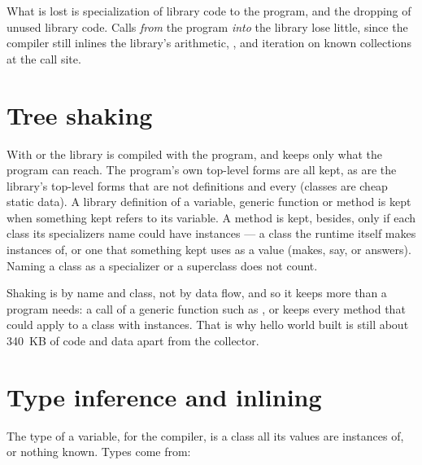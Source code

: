 What is lost is specialization of library code to the program, and the
dropping of unused library code. Calls \emph{from} the program
\emph{into} the library lose little, since the compiler still inlines
the library's arithmetic, ,  and iteration on
known collections at the call site.

\section{Tree shaking}\label{sec:internals-shaking}

With  or  the library is compiled with the
program, and  keeps only what the program can
reach. The program's own top-level forms are all kept, as are the
library's top-level forms that are not definitions and every
 (classes are cheap static data). A library
definition of a variable, generic function or method is kept when
something kept refers to its variable. A method is kept, besides, only
if each class its specializers name could have instances --- a class
the runtime itself makes instances of, or one that something kept uses
as a value (makes, say, or answers). Naming a class as a specializer or
a superclass does not count.

Shaking is by name and class, not by data flow, and so it keeps more
than a program needs: a call of a generic function such as
,  or  keeps every method that
could apply to a class with instances. That is why hello world built
 is still about 340~KB of code and data apart from the collector.

\section{Type inference and inlining}\label{sec:internals-types}
\label{sec:internals-calls}

The type of a variable, for the compiler, is a class all its values are
instances of, or nothing known. Types come from:

